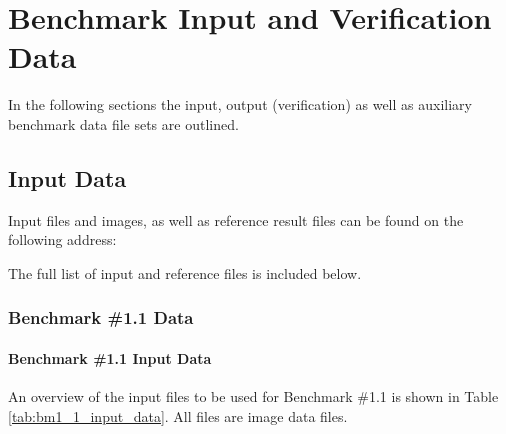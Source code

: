 \chapter{Benchmark Input and Verification Data}
In the following sections the input, output (verification) as well as auxiliary benchmark data file sets are outlined.


\section{Input Data}
Input files and images, as well as reference result files can be found on the following address:

The full list of input and reference files is included below.

\subsection{Benchmark \#1.1 Data}

\subsubsection{Benchmark \#1.1 Input Data}

An overview of the input files to be used for Benchmark \#1.1 is shown in Table \ref{tab:bm1_1_input_data}. All files are image data files.

